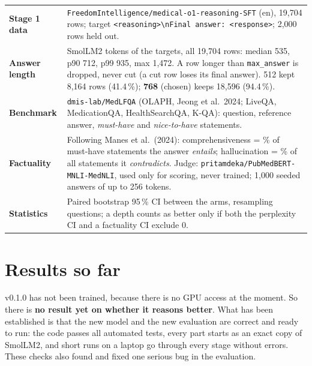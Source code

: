 \documentclass[a4paper,12pt,parskip=half,headsepline]{scrartcl}
\newcommand{\code}[1]{\texttt{\small #1}}
\begin{document}
\begin{tech}
\begin{tabularx}{\linewidth}{@{}p{3.2cm}Y@{}}
\toprule
\textbf{Stage 1 data} & \code{FreedomIntelligence/medical-o1-reasoning-SFT} (en), 19{,}704 rows; target \code{<reasoning>\textbackslash nFinal answer: <response>}; 2{,}000 rows held out.\\
\textbf{Answer length} & SmolLM2 tokens of the targets, all 19{,}704 rows: median 535, p90 712, p99 935, max 1{,}472. A row longer than \code{max\_answer} is dropped, never cut (a cut row loses its final answer). 512 kept 8{,}164 rows (41.4\,\%); \textbf{768} (chosen) keeps 18{,}596 (94.4\,\%).\\
\textbf{Benchmark} & \code{dmis-lab/MedLFQA} (OLAPH, Jeong et al.\ 2024; LiveQA, MedicationQA, HealthSearchQA, K-QA): question, reference answer, \emph{must-have} and \emph{nice-to-have} statements.\\
\textbf{Factuality} & Following Manes et al.\ (2024): comprehensiveness = \% of must-have statements the answer \emph{entails}; hallucination = \% of all statements it \emph{contradicts}. Judge: \code{pritamdeka/PubMedBERT-MNLI-MedNLI}, used only for scoring, never trained; 1{,}000 seeded answers of up to 256 tokens.\\
\textbf{Statistics} & Paired bootstrap 95\,\% CI between the arms, resampling questions; a depth counts as better only if both the perplexity CI and a factuality CI exclude 0.\\
\bottomrule
\end{tabularx}
\end{tech}

\section{Results so far}

\begin{plain}
v0.1.0 has not been trained, because there is no GPU access at the moment. So
there is \textbf{no result yet on whether it reasons better}. What has been
established is that the new model and the new evaluation are correct and ready to
run: the code passes all automated tests, every part starts as an exact copy of
SmolLM2, and short runs on a laptop go through every stage without errors. These
checks also found and fixed one serious bug in the evaluation.
\end{plain}
\end{document}

